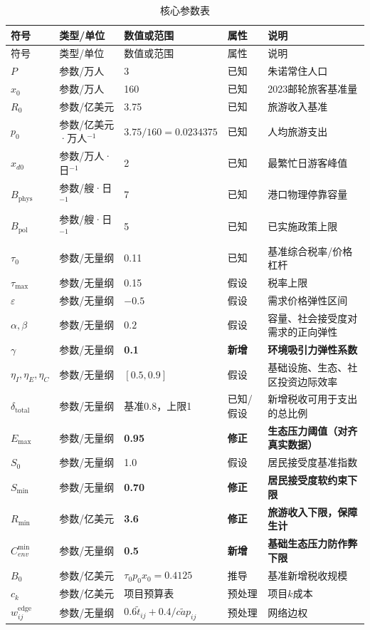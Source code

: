 \documentclass[UTF8,a4paper,12pt]{ctexart}
\begin{document}
\begin{longtable}{@{}p{1.8cm}p{2.4cm}p{3.2cm}p{1.5cm}p{5.5cm}@{}}
\caption{核心参数表}\\
\toprule
符号 & 类型/单位 & 数值或范围 & 属性 & 说明\\
\midrule
\endfirsthead
\toprule
符号 & 类型/单位 & 数值或范围 & 属性 & 说明\\
\midrule
\endhead
\(P\) & 参数/万人 & 3 & 已知 & 朱诺常住人口\\
\(x_0\) & 参数/万人 & 160 & 已知 & 2023邮轮旅客基准量\\
\(R_0\) & 参数/亿美元 & 3.75 & 已知 & 旅游收入基准\\
\(p_0\) & 参数/亿美元·万人\(^{-1}\) & \(3.75/160=0.0234375\) & 已知 & 人均旅游支出\\
\(x_{d0}\) & 参数/万人·日\(^{-1}\) & 2 & 已知 & 最繁忙日游客峰值\\
\(B_{\mathrm{phys}}\) & 参数/艘·日\(^{-1}\) & 7 & 已知 & 港口物理停靠容量\\
\(B_{\mathrm{pol}}\) & 参数/艘·日\(^{-1}\) & 5 & 已知 & 已实施政策上限\\
\(\tau_0\) & 参数/无量纲 & 0.11 & 已知 & 基准综合税率/价格杠杆\\
\(\tau_{\max}\) & 参数/无量纲 & 0.15 & 假设 & 税率上限\\
\(\varepsilon\) & 参数/无量纲 & \(-0.5\) & 假设 & 需求价格弹性区间\\
\(\alpha,\beta\) & 参数/无量纲 & \(0.2\) & 假设 & 容量、社会接受度对需求的正向弹性\\
\(\gamma\) & 参数/无量纲 & \textbf{0.1} & \textbf{新增} & \textbf{环境吸引力弹性系数}\\
\(\eta_I,\eta_E,\eta_C\) & 参数/无量纲 & \([0.5,0.9]\) & 假设 & 基础设施、生态、社区投资边际效率\\
\(\delta_{\mathrm{total}}\) & 参数/无量纲 & 基准0.8，上限1 & 已知/假设 & 新增税收可用于支出的总比例\\
\(E_{\max}\) & 参数/无量纲 & \textbf{0.95} & \textbf{修正} & \textbf{生态压力阈值（对齐真实数据）}\\
\(S_0\) & 参数/无量纲 & 1.0 & 假设 & 居民接受度基准指数\\
\(S_{\min}\) & 参数/无量纲 & \textbf{0.70} & \textbf{修正} & \textbf{居民接受度软约束下限}\\
\(R_{\min}\) & 参数/亿美元 & \textbf{3.6} & \textbf{修正} & \textbf{旅游收入下限，保障生计}\\
\(C_{env}^{\min}\) & 参数/无量纲 & \textbf{0.5} & \textbf{新增} & \textbf{基础生态压力防作弊下限}\\
\(B_0\) & 参数/亿美元 & \(\tau_0p_0x_0=0.4125\) & 推导 & 基准新增税收规模\\
\(c_k\) & 参数/亿美元 & 项目预算表 & 预处理 & 项目\(k\)成本\\
\(w_{ij}^{\mathrm{edge}}\) & 参数/无量纲 & \(0.6\tilde t_{ij}+0.4/\tilde{cap}_{ij}\) & 预处理 & 网络边权\\
\bottomrule
\end{longtable}
\end{document}
